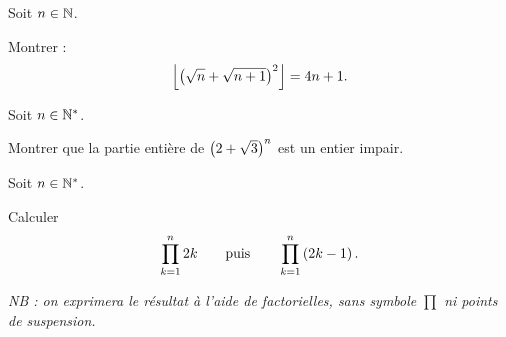 \begin{corr}
\end{corr}

\begin{exo}[Exercice 14]
Soit \(n\in\mathbb{N}\).

Montrer : \[\left\lfloor\left(\sqrt{n}+\sqrt{n+1}\right)^2\right\rfloor=4n+1.\]
\end{exo}

\begin{corr}
\end{corr}

\begin{exo}[Exercice 15]
Soit \(n\in\mathbb{N}^*\).

Montrer que la partie entière de \(\left(2+\sqrt{3}\right)^n\) est un entier impair.
\end{exo}

\begin{corr}
\end{corr}

\begin{exo}
Soit \(n\in\mathbb{N}^*\).

Calculer \[\prod_{k=1}^{n}2k\qquad\text{puis}\qquad\prod_{k=1}^{n}\left(2k-1\right).\]

\textit{NB : on exprimera le résultat à l'aide de factorielles, sans symbole \(\prod\) ni points de suspension.}
\end{exo}

\begin{corr}
\end{corr}